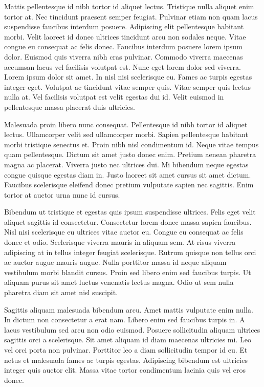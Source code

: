 \documentclass[11pt,a4paper]{article}
\begin{document}
Mattis pellentesque id nibh tortor id aliquet lectus. Tristique nulla aliquet enim tortor at. Nec tincidunt praesent semper feugiat. Pulvinar etiam non quam lacus suspendisse faucibus interdum posuere. Adipiscing elit pellentesque habitant morbi. Velit laoreet id donec ultrices tincidunt arcu non sodales neque. Vitae congue eu consequat ac felis donec. Faucibus interdum posuere lorem ipsum dolor. Euismod quis viverra nibh cras pulvinar. Commodo viverra maecenas accumsan lacus vel facilisis volutpat est. Nunc eget lorem dolor sed viverra. Lorem ipsum dolor sit amet. In nisl nisi scelerisque eu. Fames ac turpis egestas integer eget. Volutpat ac tincidunt vitae semper quis. Vitae semper quis lectus nulla at. Vel facilisis volutpat est velit egestas dui id. Velit euismod in pellentesque massa placerat duis ultricies.

Malesuada proin libero nunc consequat. Pellentesque id nibh tortor id aliquet lectus. Ullamcorper velit sed ullamcorper morbi. Sapien pellentesque habitant morbi tristique senectus et. Proin nibh nisl condimentum id. Neque vitae tempus quam pellentesque. Dictum sit amet justo donec enim. Pretium aenean pharetra magna ac placerat. Viverra justo nec ultrices dui. Mi bibendum neque egestas congue quisque egestas diam in. Justo laoreet sit amet cursus sit amet dictum. Faucibus scelerisque eleifend donec pretium vulputate sapien nec sagittis. Enim tortor at auctor urna nunc id cursus.

Bibendum ut tristique et egestas quis ipsum suspendisse ultrices. Felis eget velit aliquet sagittis id consectetur. Consectetur lorem donec massa sapien faucibus. Nisl nisi scelerisque eu ultrices vitae auctor eu. Congue eu consequat ac felis donec et odio. Scelerisque viverra mauris in aliquam sem. At risus viverra adipiscing at in tellus integer feugiat scelerisque. Rutrum quisque non tellus orci ac auctor augue mauris augue. Nulla porttitor massa id neque aliquam vestibulum morbi blandit cursus. Proin sed libero enim sed faucibus turpis. Ut aliquam purus sit amet luctus venenatis lectus magna. Odio ut sem nulla pharetra diam sit amet nisl suscipit.

Sagittis aliquam malesuada bibendum arcu. Amet mattis vulputate enim nulla. In dictum non consectetur a erat nam. Libero enim sed faucibus turpis in. A lacus vestibulum sed arcu non odio euismod. Posuere sollicitudin aliquam ultrices sagittis orci a scelerisque. Sit amet aliquam id diam maecenas ultricies mi. Leo vel orci porta non pulvinar. Porttitor leo a diam sollicitudin tempor id eu. Et netus et malesuada fames ac turpis egestas. Adipiscing bibendum est ultricies integer quis auctor elit. Massa vitae tortor condimentum lacinia quis vel eros donec.
\end{document}
